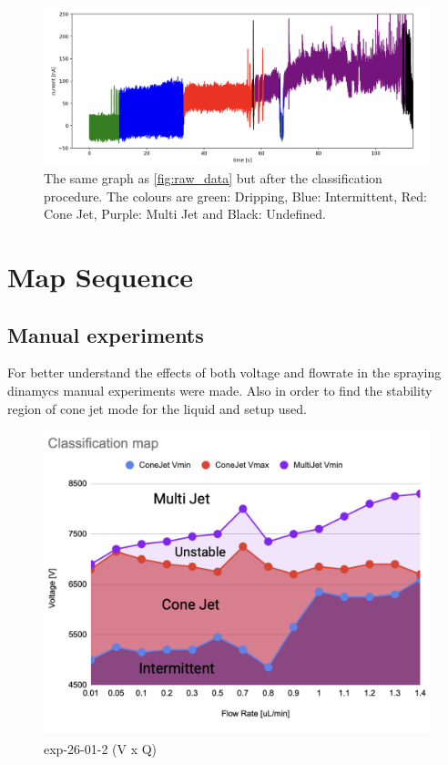 \begin{figure}[H]
    \center
    \includegraphics[width=12cm]{Figuras/19:03/classified-data-example.png}
    \caption{The same graph as \ref{fig:raw_data} but after the classification procedure. The colours are green: Dripping, Blue: Intermittent, Red: Cone Jet, Purple: Multi Jet and Black: Undefined.}
    \label{fig:class_step_data}
\end{figure}


\section{Map Sequence}
\label{sec:map_results}



    \subsection{Manual experiments}


    For better understand the effects of both voltage and flowrate in the spraying dinamycs manual experiments were made.
    Also in order to find the stability region of cone jet mode for the liquid and setup used.

    \begin{figure}[H]
        \center
        \includegraphics[width=12cm]{Figuras/regions.png}
        \caption{ exp-26-01-2 (V x Q)}
    \end{figure}


